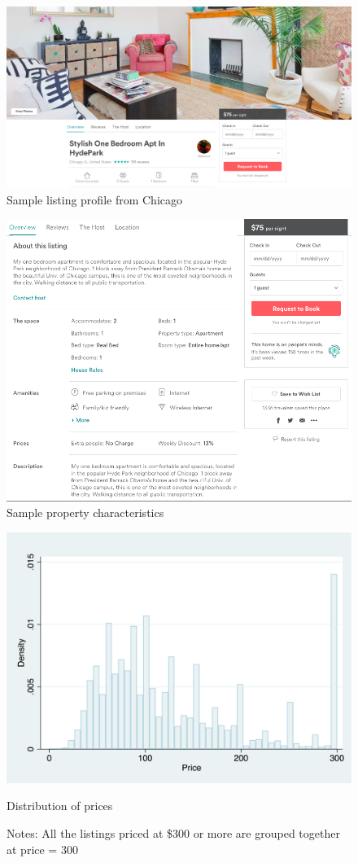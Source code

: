 \singlespacing

\begin{figure}[h]
	\includegraphics[width=1\textwidth]{tables/sample1-cover}
	\caption{Sample listing profile from Chicago}
	\label{fig:listing}
\end{figure}
\begin{figure}
	\includegraphics[width=1\textwidth]{tables/sample2-property}
	\caption{Sample property characteristics}
	\label{fig:property}
\end{figure}

\begin{figure}\centering
	\includegraphics[width=.8\textwidth]{figures/price_dist-CONT-300}
	\caption{Distribution of prices}
	\caption*{Notes: All the listings priced at \$300 or more are grouped together at price = 300}
	\label{fig:prices}
\end{figure}

